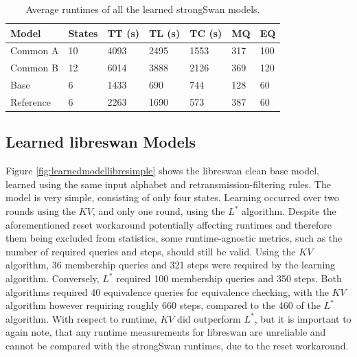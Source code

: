 \begin{table}[h]
	\centering
	\begin{tabular}{|l|l|l|l|l|l|l|}
		\hline
		\rowcolor[HTML]{C0C0C0} 
		Model     & States & TT (s)   & TL (s)   	  & TC (s)   & MQ  & EQ  \\ \hline
		Common A  & 10     & 4093 	  & 2495	 	  & 1553 	 & 317 & 100 \\ \hline
		Common B  & 12     & 6014 	  & 3888		  & 2126 	 & 369 & 120 \\ \hline
		Base      & 6      & 1433 	  & 690 		  & 744  	 & 128 & 60  \\ \hline
		Reference & 6      & 2263 	  & 1690		  & 573  	 & 387 & 60  \\ \hline
	\end{tabular}
	\caption{Average runtimes of all the learned strongSwan models.}
	\label{tab:runtime_summary_averages}
\end{table}

\subsection{Learned libreswan Models}
Figure \ref{fig:learnedmodellibresimple} shows the libreswan clean base model, learned using the same input alphabet and retransmission-filtering rules. The model is very simple, consisting of only four states. Learning occurred over two rounds using the $KV$, and only one round, using the $L^*$ algorithm. Despite the aforementioned reset workaround potentially affecting runtimes and therefore them being excluded from statistics, some runtime-agnostic metrics, such as the number of required queries and steps, should still be valid. Using the $KV$ algorithm, 36 membership queries and 321 steps were required by the learning algorithm. Conversely, $L^*$ required 100 membership queries and 350 steps. Both algorithms required 40 equivalence queries for equivalence checking, with the $KV$ algorithm however requiring roughly 660 steps, compared to the 460 of the $L^*$ algorithm. With respect to runtime, $KV$ did outperform $L^*$, but it is important to again note, that any runtime measurements for libreswan are unreliable and cannot be compared with the strongSwan runtimes, due to the reset workaround.

